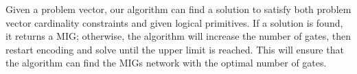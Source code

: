 \documentclass[conference,letterpaper]{IEEEtran}
\begin{document}
%

Given a problem vector, our algorithm can find a solution to satisfy both problem vector cardinality constraints and given logical primitives. If a solution is found, it returns a MIG; otherwise, the algorithm will increase the number of gates, then restart encoding and solve until the upper limit is reached. This will ensure that the algorithm can find the MIGs network with the optimal number of gates.
\end{document}
